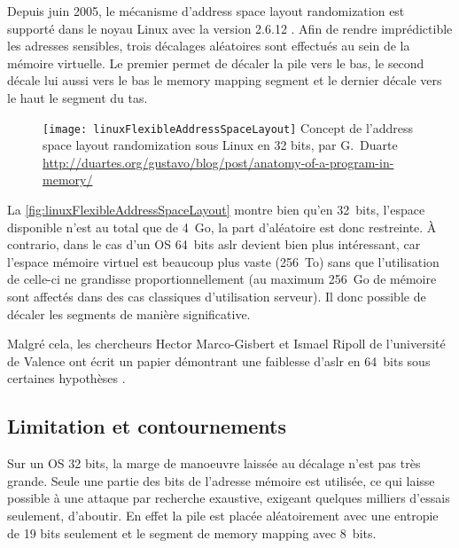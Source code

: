 Depuis juin 2005, le mécanisme d'\og address space layout randomization \fg est supporté dans le noyau Linux avec la version 2.6.12 \cite{AddressSpaceLayoutRandomizationFR, AddressSpaceLayoutRandomizationEN}. Afin de rendre imprédictible les adresses sensibles, trois décalages aléatoires sont effectués au sein de la mémoire virtuelle. Le premier permet de décaler la pile vers le bas, le second décale lui aussi vers le bas le \og memory mapping segment \fg et le dernier décale vers le haut le segment du tas.

\begin{figure}[H]
	\centering
	\texttt{[image: linuxFlexibleAddressSpaceLayout]}
	{Concept de l'address space layout randomization sous Linux en 32 bits, par G.~Duarte}
	{\url{http://duartes.org/gustavo/blog/post/anatomy-of-a-program-in-memory/}}
	\label{fig:linuxFlexibleAddressSpaceLayout}
\end{figure}

La \autoref{fig:linuxFlexibleAddressSpaceLayout} montre bien qu'en 32~bits, l'espace disponible n'est au total que de 4~Go, la part d'aléatoire est donc restreinte. À contrario, dans le cas d'un OS 64~bits \gls{aslr} devient bien plus intéressant, car l'espace mémoire virtuel est beaucoup plus vaste (256~To) sans que l'utilisation de celle-ci ne grandisse proportionnellement (au maximum 256~Go de mémoire sont affectés dans des cas classiques d'utilisation serveur). Il donc possible de décaler les segments de manière significative.

Malgré cela, les chercheurs Hector Marco-Gisbert et Ismael Ripoll de l'université de Valence ont écrit un papier démontrant une faiblesse d'\gls{aslr} en 64~bits sous certaines hypothèses \cite{EffectivenessFullASLR64bit}.

\subsection{Limitation et contournements}

Sur un OS 32 bits, la marge de manoeuvre laissée au décalage n'est pas très grande. Seule une partie des bits de l'adresse mémoire est utilisée, ce qui laisse possible à une attaque par recherche exaustive, exigeant quelques milliers d'essais seulement, d'aboutir. En effet la pile est placée aléatoirement avec une entropie de 19 bits seulement et le segment de \og memory mapping \fg avec 8~bits.


